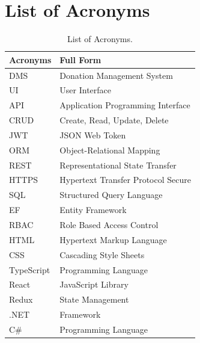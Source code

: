 \documentclass{thesis-library}
\begin{document}
\chapter*{List of Acronyms}
\vspace{-40pt}
\begin{table}[h]
    \renewcommand{\arraystretch}{1.6}
    \centering
    \caption{List of Acronyms.}
    \vspace{10pt}
    \begin{tabularx}{\linewidth}{|l|L|}
        \hline
        \textbf{Acronyms} & \textbf{Full Form} \\
        \hline
        DMS & Donation Management System\\
        UI & User Interface\\
        API & Application Programming Interface\\
        CRUD & Create, Read, Update, Delete\\
        JWT & JSON Web Token\\
        ORM & Object-Relational Mapping\\
        REST & Representational State Transfer\\
        HTTPS & Hypertext Transfer Protocol Secure\\
        SQL & Structured Query Language\\
        EF & Entity Framework\\
        RBAC & Role Based Access Control\\
        HTML & Hypertext Markup Language\\
        CSS & Cascading Style Sheets\\
        TypeScript & Programming Language\\
        React & JavaScript Library\\
        Redux & State Management\\
        .NET & Framework\\
        C\# & Programming Language\\
        \hline
    \end{tabularx}
\end{table}
\end{document}

